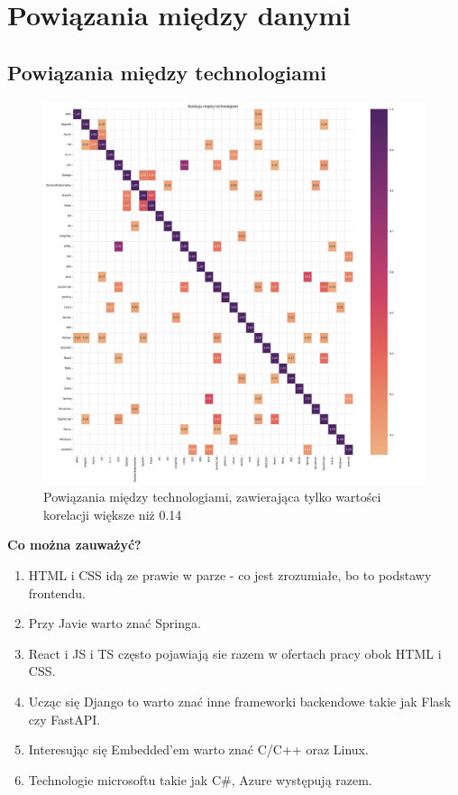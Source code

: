 \documentclass[a4paper]{article}
\begin{document}
\section{Powiązania między danymi}

\subsection{Powiązania między technologiami}

\begin{figure}[H]
    \centering
    \includegraphics[width=\textwidth]{../analysis/plots/korelacje/korelacja_między_technologiami.png}
    \caption{Powiązania między technologiami, zawierająca tylko wartości korelacji większe niż 0.14}
\end{figure}

\quad \textbf{Co można zauważyć?}

\begin{enumerate}
    \item HTML i CSS idą ze prawie w parze - co jest zrozumiałe, bo to podstawy frontendu.
    \item Przy Javie warto znać Springa.
    \item React i JS i TS często pojawiają sie razem w ofertach pracy obok HTML i CSS.
    \item Ucząc się Django to warto znać inne frameworki backendowe takie jak Flask czy FastAPI.
    \item Interesując się Embedded'em warto znać C/C++ oraz Linux.
    \item Technologie microsoftu takie jak C\#, Azure występują razem.
\end{enumerate}
\end{document}
